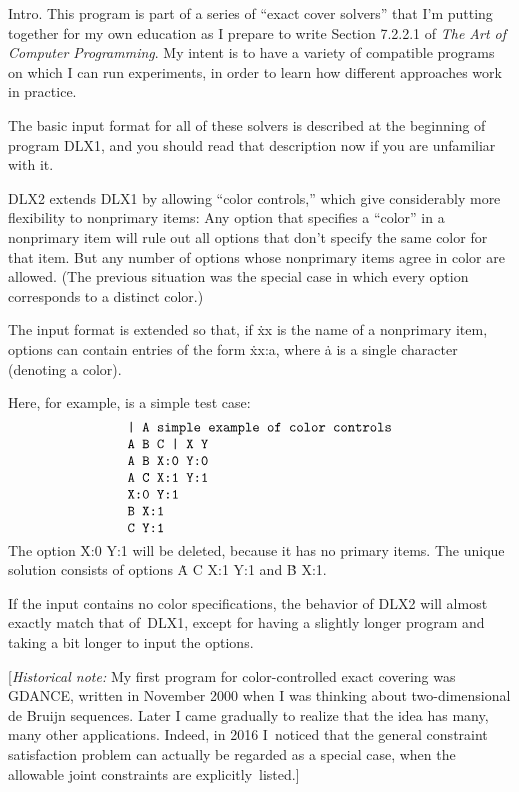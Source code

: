 
\let\Xmod=\bmod %

\datethis

Intro. This program is part of a series of ``exact cover solvers'' that
I'm putting together for my own education as I prepare to write Section
7.2.2.1 of {\sl The Art of Computer Programming}. My intent is to
have a variety of compatible programs on which I can run experiments,
in order to learn how different approaches work in practice.

The basic input format for all of these solvers is described at the beginning
of program {\mc DLX1}, and you should read that description now if you are
unfamiliar with it.

{\mc DLX2} extends {\mc DLX1} by allowing ``color controls,'' which give
considerably more flexibility to nonprimary items: Any option that specifies
a ``color'' in a nonprimary item will rule out all options that don't
specify the same color for that item. But any number of options whose
nonprimary items agree in color are allowed. (The previous
situation was the special case in which every option corresponds to a
distinct color.)

The input format is extended so that, if \.{xx} is the name of a nonprimary
item, options can contain entries of the form \.{xx:a}, where \.a is
a single character (denoting a color).

Here, for example, is a simple test case:
$$
\vcenter{\halign{\tt#\cr
\char"7C\ A simple example of color controls\cr
A B C \char"7C\ X Y\cr
A B X:0 Y:0\cr
A C X:1 Y:1\cr
X:0 Y:1\cr
B X:1\cr
C Y:1\cr}}
$$
The option \.{X:0 Y:1} will be deleted, because it has no primary items.
The unique solution consists of options \.{A C X:1 Y:1} and \.{B X:1}.

If the input contains no color specifications, the behavior of {\mc DLX2}
will almost exactly match that of~{\mc DLX1}, except for having a
slightly longer program and taking a bit longer to input the options.

[{\it Historical note:\/} My first program for color-controlled exact
covering was {\mc GDANCE}, written in November 2000 when I was thinking
about two-dimensional de Bruijn sequences. Later I came gradually to
realize that the idea has many, many other applications. Indeed, in 2016
I~noticed that the general constraint satisfaction problem can actually
be regarded as a special case, when the allowable joint constraints are
explicitly~listed.]

